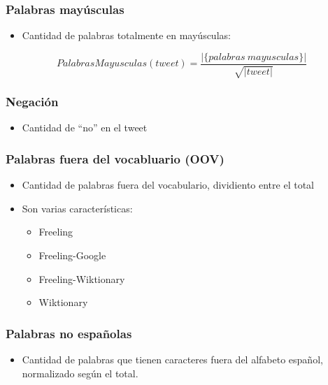 \begin{frame}
    \frametitle{Palabras mayúsculas}

    \begin{itemize}
        \item Cantidad de palabras totalmente en mayúsculas:
    \end{itemize}

    \begin{center}
        \[
            PalabrasMayusculas(tweet) = \frac{|\{palabras\ mayusculas\}|}{\sqrt{|tweet|}}
        \]
    \end{center}
\end{frame}

\begin{frame}
    \frametitle{Negación}

    \begin{itemize}
        \item Cantidad de ``no'' en el tweet
    \end{itemize}
\end{frame}

\begin{frame}
    \frametitle{Palabras fuera del vocabluario (OOV)}

    \begin{itemize}
        \item Cantidad de palabras fuera del vocabulario, dividiento entre el total
        \item Son varias características:
        \begin{itemize}
            \item Freeling
            \item Freeling-Google
            \item Freeling-Wiktionary
            \item Wiktionary
        \end{itemize}
    \end{itemize}
\end{frame}

\begin{frame}
    \frametitle{Palabras no españolas}

    \begin{itemize}
        \item Cantidad de palabras que tienen caracteres fuera del alfabeto español, normalizado según el total.
    \end{itemize}
\end{frame}

